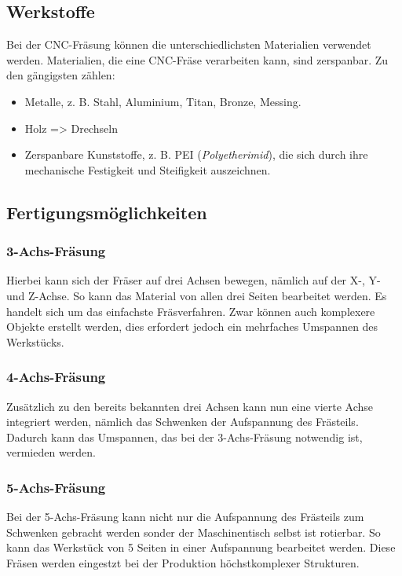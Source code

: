 \subsection{Werkstoffe}
Bei der CNC-Fräsung können die unterschiedlichsten Materialien verwendet werden. Materialien, die eine CNC-Fräse verarbeiten kann, sind zerspanbar. Zu den gängigsten zählen:

\begin{itemize}
	\item Metalle, z. B. Stahl, Aluminium, Titan, Bronze, Messing.
	\item Holz => Drechseln
	\item Zerspanbare Kunststoffe, z. B. PEI (\emph{Polyetherimid}), die sich durch ihre mechanische Festigkeit und Steifigkeit auszeichnen.
\end{itemize}
\cite{CNC-Fräsen_3} \cite{PEIZerspannung} \cite{PEIKunststoff-Polyetherimid}

\subsection{Fertigungsmöglichkeiten}

\subsubsection{3-Achs-Fräsung}
Hierbei kann sich der Fräser auf drei Achsen bewegen, nämlich auf der X-, Y- und Z-Achse. So kann das Material von allen drei Seiten bearbeitet werden. Es handelt sich um das einfachste Fräsverfahren. Zwar können auch komplexere Objekte erstellt werden, dies erfordert jedoch ein mehrfaches Umspannen des Werkstücks.

\subsubsection{4-Achs-Fräsung}
Zusätzlich zu den bereits bekannten drei Achsen kann nun eine vierte Achse integriert werden, nämlich das Schwenken der Aufspannung des Frästeils. Dadurch kann das Umspannen, das bei der 3-Achs-Fräsung notwendig ist, vermieden werden.

\subsubsection{5-Achs-Fräsung}
Bei der 5-Achs-Fräsung kann nicht nur die Aufspannung des Frästeils zum Schwenken gebracht werden sonder der Maschinentisch selbst ist rotierbar. So kann das Werkstück von 5 Seiten in einer Aufspannung bearbeitet werden. Diese Fräsen werden eingestzt bei der Produktion höchstkomplexer Strukturen.

